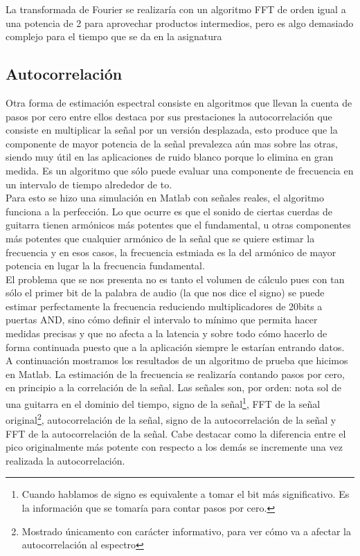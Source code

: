 	La transformada de Fourier se realizaría con un algoritmo FFT de orden igual a una potencia de 2 para aprovechar productos intermedios, pero es algo demasiado complejo para el tiempo que se da en la asignatura 
	\subsection{Autocorrelación}
	Otra forma de estimación espectral consiste en algoritmos que llevan la cuenta de pasos por cero entre ellos destaca por sus prestaciones la autocorrelación que consiste en multiplicar la señal por un versión desplazada, esto produce que la componente de mayor potencia de la señal prevalezca aún mas sobre las otras, siendo muy útil en las aplicaciones de ruido blanco porque lo elimina en gran medida. Es un algoritmo que sólo puede evaluar una componente de frecuencia en un intervalo de tiempo alrededor de to. \\

	Para esto se hizo una simulación en Matlab con señales reales, el algoritmo funciona a la perfección. Lo que ocurre es que el sonido de ciertas cuerdas de guitarra tienen armónicos más potentes que el fundamental, u otras componentes más potentes que cualquier armónico de la señal que se quiere estimar la frecuencia y en esos casos, la frecuencia estmiada es la del armónico de mayor potencia en lugar la la frecuencia fundamental. \\

	El problema que se nos presenta no es tanto el volumen de cálculo pues con tan sólo el primer bit de la palabra de audio (la que nos dice el signo) se puede estimar perfectamente la frecuencia reduciendo multiplicadores de 20bits a puertas AND, sino cómo definir el intervalo to mínimo que permita hacer medidas precisas y que no afecta a la latencia y sobre todo cómo hacerlo de forma continuada puesto que a la aplicación siempre le estarían entrando datos.\\

	A continuación mostramos los resultados de un algoritmo de prueba que hicimos en Matlab. La estimación de la frecuencia se realizaría contando pasos por cero, en principio a la correlación de la señal. Las señales son, por orden: nota sol de una guitarra en el dominio del tiempo, signo de la señal\footnote{Cuando hablamos de signo es equivalente a tomar el bit más significativo. Es la información que se tomaría para contar pasos por cero.}, FFT de la señal original\footnote{Mostrado únicamento con carácter informativo, para ver cómo va a afectar la autocorrelación al espectro}, autocorrelación de la señal, signo de la autocorrelación de la señal y FFT de la autocorrelación de la señal. Cabe destacar como la diferencia entre el pico originalmente más potente con respecto a los demás se incremente una vez realizada la autocorrelación.

